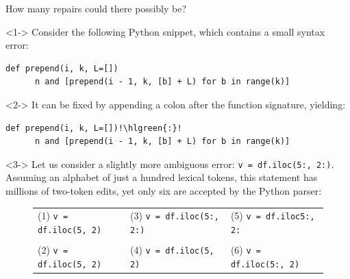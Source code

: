 \documentclass{beamer}
\begin{document}
\begin{frame}[t,fragile]{How many repairs could there possibly be?}
  \begin{onlyenv}<1->
  Consider the following Python snippet, which contains a small syntax error:\\

  \begin{lstlisting}[escapechar=!, basicstyle=\linespread{1.3}\ttfamily\footnotesize]
    def prepend(i, k, L=[])
      n and [prepend(i - 1, k, [b] + L) for b in range(k)]
  \end{lstlisting}
  \end{onlyenv}

  \begin{onlyenv}<2->
  It can be fixed by appending a colon after the function signature, yielding:\\

  \begin{lstlisting}[escapechar=!, basicstyle=\linespread{1.3}\ttfamily\footnotesize]
    def prepend(i, k, L=[])!\hlgreen{:}!
      n and [prepend(i - 1, k, [b] + L) for b in range(k)]
  \end{lstlisting}

  \vspace{0.5cm}
  \end{onlyenv}

  \begin{onlyenv}<3->
  \normalsize Let us consider a slightly more ambiguous error: \footnotesize{\texttt{v = df.iloc(5:, 2:)}}. \normalsize Assuming an alphabet of just a hundred lexical tokens, this statement has millions of two-token edits, yet only six are accepted by the Python parser:

    \scriptsize
    \begin{figure}[h!]
      \noindent\begin{tabular}{@{}l@{\hspace{10pt}}l@{\hspace{10pt}}l@{}}
      (1) \texttt{v = df.iloc(5\hlred{:}, 2\hlorange{,})} & (3) \texttt{v = df.iloc(5\hlgreen{[}:, 2:\hlgreen{]})} & (5) \texttt{v = df.iloc\hlorange{[}5:, 2:\hlorange{]}} \\\\
      (2) \texttt{v = df.iloc(5\hlorange{)}, 2\hlorange{(})} & (4) \texttt{v = df.iloc(5\hlred{:}, 2\hlred{:})} & (6) \texttt{v = df.iloc(5\hlgreen{[}:, 2\hlorange{]})} \\
      \end{tabular}
    \end{figure}
  \end{onlyenv}
\end{frame}
\end{document}
